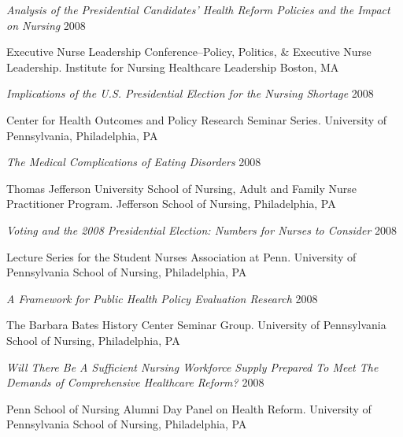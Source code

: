 \documentclass[10pt,]{article}
\begin{document}
{{{{{{{{{{{{{{{\begin{hangparas}{.5in}{1}
{\textit {Analysis of the Presidential Candidates’ Health Reform Policies and the Impact on Nursing}} \hfill 2008 
\vspace{-2.5mm}
\begin{adjustwidth}{0.5cm}{1cm}
Executive Nurse Leadership Conference–Policy, Politics, \& Executive Nurse Leadership. Institute for Nursing Healthcare Leadership Boston, MA
\end{adjustwidth}

{\textit {Implications of the U.S. Presidential Election for the Nursing Shortage}} \hfill 2008 
\vspace{-2.5mm}
\begin{adjustwidth}{0.5cm}{1cm}
Center for Health Outcomes and Policy Research Seminar Series. University of Pennsylvania, Philadelphia, PA
\end{adjustwidth}

{\textit {The Medical Complications of Eating Disorders}} \hfill 2008 
\vspace{-2.5mm}
\begin{adjustwidth}{0.5cm}{1cm}
Thomas Jefferson University School of Nursing, Adult and Family Nurse Practitioner Program. Jefferson School of Nursing, Philadelphia, PA
\end{adjustwidth}

{\textit {Voting and the 2008 Presidential Election: Numbers for Nurses to Consider}} \hfill 2008 
\vspace{-2.5mm}
\begin{adjustwidth}{0.5cm}{1cm}
Lecture Series for the Student Nurses Association at Penn. University of Pennsylvania School of Nursing, Philadelphia, PA
\end{adjustwidth}

{\textit {A Framework for Public Health Policy Evaluation Research}} \hfill 2008 
\vspace{-2.5mm}
\begin{adjustwidth}{0.5cm}{1cm}
The Barbara Bates History Center Seminar Group. University of Pennsylvania School of Nursing, Philadelphia, PA
\end{adjustwidth}

{\textit {Will There Be A Sufficient Nursing Workforce Supply Prepared To Meet The Demands of Comprehensive Healthcare Reform?}} \hfill 2008 
\vspace{-2.5mm}
\begin{adjustwidth}{0.5cm}{1cm}
Penn School of Nursing Alumni Day Panel on Health Reform. University of Pennsylvania School of Nursing, Philadelphia, PA
\end{adjustwidth}


\end{hangparas}}}}}}}}}}}}}}}}
\end{document}
